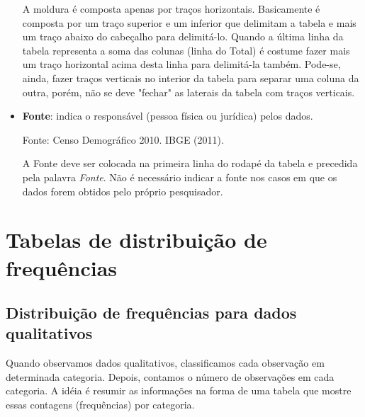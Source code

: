 \documentclass[11pt,fleqn]{book} %
\begin{document}
\begin{example}
\begin{itemize}
	A moldura é composta apenas por traços horizontais. Basicamente é composta por um traço superior e um inferior que delimitam a tabela e mais um traço abaixo do cabeçalho para delimitá-lo. Quando a última linha da tabela representa a soma das colunas (linha do Total) é costume fazer mais um traço horizontal acima desta linha para delimitá-la também. Pode-se, ainda, fazer traços verticais no interior da tabela para separar uma coluna da outra, porém, não se deve "fechar" as laterais da tabela com traços verticais.\\
	
	\item {\bf Fonte}: indica o responsável (pessoa física ou jurídica) pelos dados.
	\begin{eBox} 
	\footnotesize Fonte: Censo Demográfico 2010. IBGE (2011).  
	\end{eBox}
	
	A Fonte deve ser colocada na primeira linha do rodapé da tabela e precedida pela palavra {\itshape Fonte}. 
	Não é necessário indicar a fonte nos casos em que os dados forem obtidos pelo próprio pesquisador.

	\end{itemize}
\end{example}



\section{Tabelas de distribuição de frequências}
\vspace{0,3cm}
\subsection{Distribuição de frequências para dados qualitativos}
\vspace{0,3cm}

Quando observamos dados qualitativos, classificamos cada observação em determinada categoria. Depois, contamos o número de observações em cada categoria. A idéia é resumir as informações na forma de uma tabela que mostre essas contagens (frequências) por categoria.\\
\end{document}
